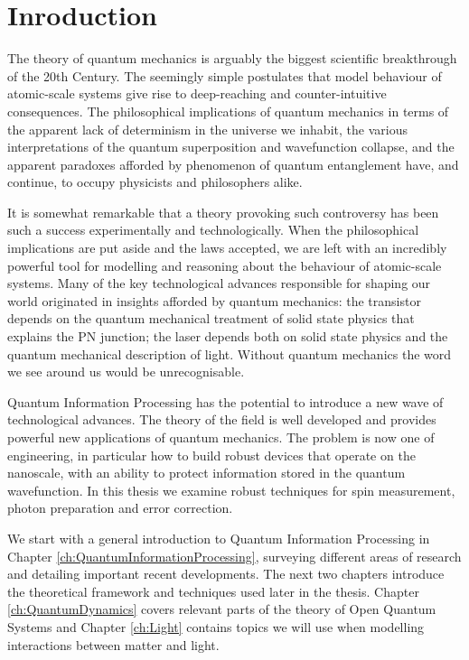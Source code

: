 \chapter{Inroduction} 
\label{ch:Motivation}

The theory of quantum mechanics is arguably the biggest scientific breakthrough of the 20th Century. The seemingly simple postulates that model behaviour of atomic-scale systems give rise to deep-reaching and counter-intuitive consequences. The philosophical implications of quantum mechanics in terms of the apparent lack of determinism in the universe we inhabit, the various interpretations of the quantum superposition and wavefunction collapse, and the apparent paradoxes afforded by phenomenon of quantum entanglement have, and continue, to occupy physicists and philosophers alike.

It is somewhat remarkable that a theory provoking such controversy has been such a success experimentally and technologically. When the philosophical implications are put aside and the laws accepted, we are left with an incredibly powerful tool for modelling and reasoning about the behaviour of atomic-scale systems. Many of the key technological advances responsible for shaping our world originated in insights afforded by quantum mechanics: the transistor depends on the quantum mechanical treatment of solid state physics that explains the PN junction; the laser depends both on solid state physics and the quantum mechanical description of light. Without quantum mechanics the word we see around us would be unrecognisable.

Quantum Information Processing has the potential to introduce a new wave of technological advances. The theory of the field is well developed and provides  powerful new applications of quantum mechanics. The problem is now one of engineering, in particular how to build robust devices that operate on the nanoscale, with an ability to protect information stored in the quantum wavefunction. In this thesis we examine robust techniques for spin measurement, photon preparation and error correction.

We start with a general introduction to Quantum Information Processing in Chapter \ref{ch:QuantumInformationProcessing}, surveying different areas of research and detailing important recent developments. The next two chapters introduce the theoretical framework and techniques used later in the thesis. Chapter \ref{ch:QuantumDynamics} covers relevant parts of the theory of Open Quantum Systems and Chapter \ref{ch:Light} contains topics we will use when modelling interactions between matter and light.

